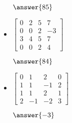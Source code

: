 \documentclass{ximera}
\begin{document}
\begin{exercise}
\begin{itemize}
        $\answer{85}$
        \item
        $\begin{bmatrix}
            0 & 2 & 5 & 7 \\
            0 & 0 & 2 & -3 \\
            3 & 4 & 5 & 7 \\
            0 & 0 & 2 & 4
        \end{bmatrix}$

        $\answer{84}$
        \item
        $\begin{bmatrix}
            0 &  1 &  2 &  0 \\
            1 &  1 & -1 & 2 \\
            1 &  1 &  2 & 1 \\
            2 & -1 & -2 & 3
        \end{bmatrix}$

        $\answer{-3}$
    \end{itemize}
\end{exercise}
\end{document}
